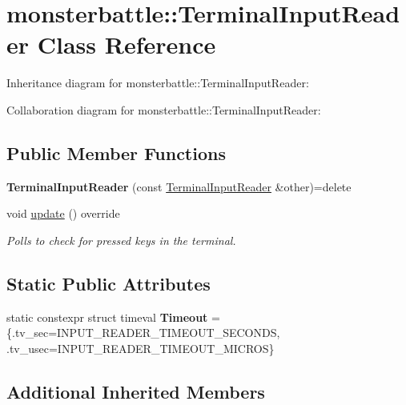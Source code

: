 \hypertarget{classmonsterbattle_1_1TerminalInputReader}{}\section{monsterbattle\+:\+:Terminal\+Input\+Reader Class Reference}
\label{classmonsterbattle_1_1TerminalInputReader}


Inheritance diagram for monsterbattle\+:\+:Terminal\+Input\+Reader\+:


Collaboration diagram for monsterbattle\+:\+:Terminal\+Input\+Reader\+:
\subsection*{Public Member Functions}
\begin{DoxyCompactItemize}
\item 
\mbox{\label{classmonsterbattle_1_1TerminalInputReader_a045538591653769cd2c27083ca428d82}} 
{\bfseries Terminal\+Input\+Reader} (const \hyperlink{classmonsterbattle_1_1TerminalInputReader}{Terminal\+Input\+Reader} \&other)=delete
\item 
void \hyperlink{classmonsterbattle_1_1TerminalInputReader_ab665f9a9907e3435acdbf10c14ebb307}{update} () override
\begin{DoxyCompactList}\small\item\em Polls to check for pressed keys in the terminal. \end{DoxyCompactList}\end{DoxyCompactItemize}
\subsection*{Static Public Attributes}
\begin{DoxyCompactItemize}
\item 
\mbox{\label{classmonsterbattle_1_1TerminalInputReader_a3f2157bd6708578c878110e83ed3d3d6}} 
static constexpr struct timeval {\bfseries Timeout} = \{.tv\+\_\+sec=I\+N\+P\+U\+T\+\_\+\+R\+E\+A\+D\+E\+R\+\_\+\+T\+I\+M\+E\+O\+U\+T\+\_\+\+S\+E\+C\+O\+N\+DS, .tv\+\_\+usec=I\+N\+P\+U\+T\+\_\+\+R\+E\+A\+D\+E\+R\+\_\+\+T\+I\+M\+E\+O\+U\+T\+\_\+\+M\+I\+C\+R\+OS\}
\end{DoxyCompactItemize}
\subsection*{Additional Inherited Members}


